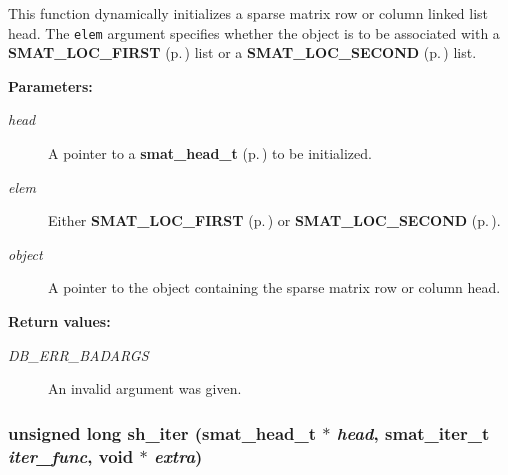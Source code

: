  This function dynamically initializes a sparse matrix row or column linked list head. The {\tt elem} argument specifies whether the object is to be associated with a {\bf SMAT\_\-LOC\_\-FIRST} {\rm (p.\,\pageref{group__dbprim__smat_a48a102})} list or a {\bf SMAT\_\-LOC\_\-SECOND} {\rm (p.\,\pageref{group__dbprim__smat_a48a103})} list.\begin{Desc}
\item[{\bf Parameters: }]\par
\begin{description}
\item[
{\em head}]A pointer to a {\bf smat\_\-head\_\-t} {\rm (p.\,\pageref{group__dbprim__smat_a1})} to be initialized. \item[
{\em elem}]Either {\bf SMAT\_\-LOC\_\-FIRST} {\rm (p.\,\pageref{group__dbprim__smat_a48a102})} or {\bf SMAT\_\-LOC\_\-SECOND} {\rm (p.\,\pageref{group__dbprim__smat_a48a103})}. \item[
{\em object}]A pointer to the object containing the sparse matrix row or column head.\end{description}
\end{Desc}
\begin{Desc}
\item[{\bf Return values: }]\par
\begin{description}
\item[
{\em DB\_\-ERR\_\-BADARGS}]An invalid argument was given. \end{description}
\end{Desc}
\subsubsection{\setlength{\rightskip}{0pt plus 5cm}unsigned long sh\_\-iter ({\bf smat\_\-head\_\-t} $\ast$ {\em head}, {\bf smat\_\-iter\_\-t} {\em iter\_\-func}, void $\ast$ {\em extra})}\label{group__dbprim__smat_a20}




